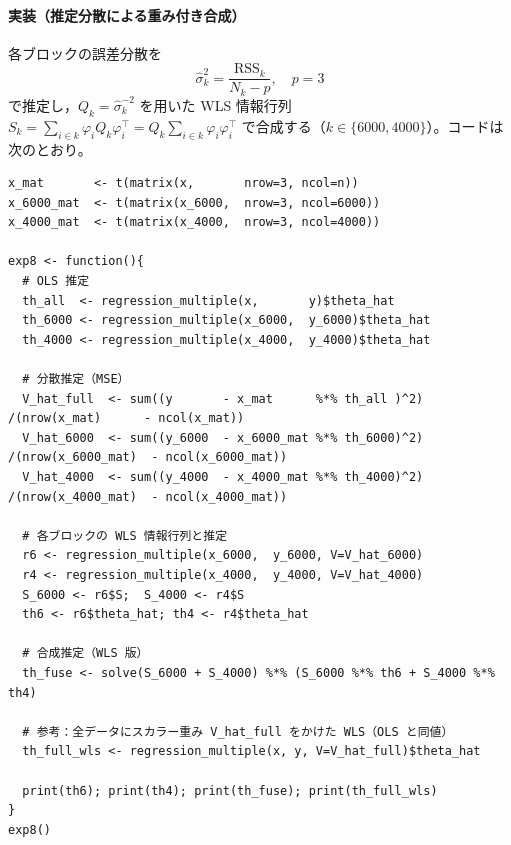 \paragraph{実装（推定分散による重み付き合成）}
各ブロックの誤差分散を
\[
  \hat\sigma_k^2=\frac{\mathrm{RSS}_k}{N_k-p},\quad p=3
\]
で推定し，$Q_k=\hat\sigma_k^{-2}$ を用いた WLS 情報行列
$S_k=\sum_{i\in k}\varphi_i Q_k \varphi_i^\top=Q_k\sum_{i\in k}\varphi_i\varphi_i^\top$
で合成する（$k\in\{6000,4000\}$）。コードは次のとおり。
\begin{lstlisting}
x_mat       <- t(matrix(x,       nrow=3, ncol=n))
x_6000_mat  <- t(matrix(x_6000,  nrow=3, ncol=6000))
x_4000_mat  <- t(matrix(x_4000,  nrow=3, ncol=4000))

exp8 <- function(){
  # OLS 推定
  th_all  <- regression_multiple(x,       y)$theta_hat
  th_6000 <- regression_multiple(x_6000,  y_6000)$theta_hat
  th_4000 <- regression_multiple(x_4000,  y_4000)$theta_hat

  # 分散推定（MSE）
  V_hat_full  <- sum((y       - x_mat      %*% th_all )^2)  /(nrow(x_mat)      - ncol(x_mat))
  V_hat_6000  <- sum((y_6000  - x_6000_mat %*% th_6000)^2) /(nrow(x_6000_mat)  - ncol(x_6000_mat))
  V_hat_4000  <- sum((y_4000  - x_4000_mat %*% th_4000)^2) /(nrow(x_4000_mat)  - ncol(x_4000_mat))

  # 各ブロックの WLS 情報行列と推定
  r6 <- regression_multiple(x_6000,  y_6000, V=V_hat_6000)
  r4 <- regression_multiple(x_4000,  y_4000, V=V_hat_4000)
  S_6000 <- r6$S;  S_4000 <- r4$S
  th6 <- r6$theta_hat; th4 <- r4$theta_hat

  # 合成推定（WLS 版）
  th_fuse <- solve(S_6000 + S_4000) %*% (S_6000 %*% th6 + S_4000 %*% th4)

  # 参考：全データにスカラー重み V_hat_full をかけた WLS（OLS と同値）
  th_full_wls <- regression_multiple(x, y, V=V_hat_full)$theta_hat

  print(th6); print(th4); print(th_fuse); print(th_full_wls)
}
exp8()
\end{lstlisting}

